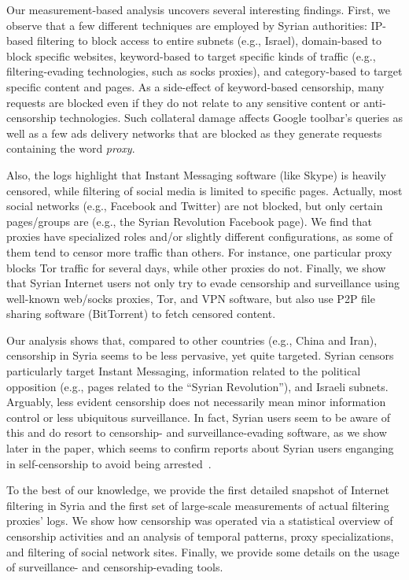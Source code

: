 \documentclass{sig-alternate-2013}
\newcommand{\descr}[1]{\smallskip\noindent{\bf #1}}
\begin{document}
\descr{Main Findings.}  Our measurement-based analysis uncovers several interesting findings. First, we observe that a few different techniques are employed by Syrian authorities: IP-based filtering to block access to entire subnets (e.g., Israel), domain-based to block specific websites, keyword-based to target specific kinds of traffic (e.g., filtering-evading technologies, such as socks proxies), and category-based to target specific content and pages.
As a side-effect of keyword-based censorship, many requests are blocked even if they do not relate to any sensitive content or anti-censorship technologies. Such collateral damage affects Google toolbar's queries as well as a few ads delivery networks that are blocked as they generate requests containing the word {\em proxy}.





Also, the logs highlight that Instant Messaging software (like Skype) is heavily censored, while filtering of social media is limited to specific pages. Actually, most social networks (e.g., Facebook and Twitter) are not blocked, but only certain pages/groups are (e.g., the Syrian Revolution Facebook page).
We find that proxies have specialized roles and/or slightly different configurations, as some of them tend to censor more traffic than others. For instance, one particular proxy blocks Tor traffic for several days, while other proxies do not.
Finally, we show that Syrian Internet users not only try to evade censorship and surveillance using well-known web/socks proxies, Tor, and VPN software, but also use P2P file sharing software (BitTorrent) to fetch censored content. 





Our analysis shows that, compared to other countries (e.g., China and Iran), censorship in Syria seems to be less pervasive, yet quite targeted. Syrian censors particularly target Instant Messaging, information related to the political opposition (e.g., pages related to the ``Syrian Revolution''), and Israeli subnets.
Arguably, less evident censorship does not necessarily mean minor information control or less ubiquitous surveillance. In fact, Syrian users seem to be aware of this and do resort to censorship- and surveillance-evading software, as we show later in the paper, which seems to confirm reports about Syrian users enganging in self-censorship to avoid being arrested~\cite{selfcensorship,bbc,oni}.  


\descr{Contributions.} To the best of our knowledge, we provide the first detailed snapshot of Internet filtering in Syria and the first set of large-scale measurements of actual filtering proxies' logs.
We show how censorship was operated via a statistical overview of censorship activities and an analysis of temporal patterns, proxy specializations, and filtering of social network sites. Finally, we provide some details on the usage of surveillance- and  censorship-evading tools.
\end{document}
